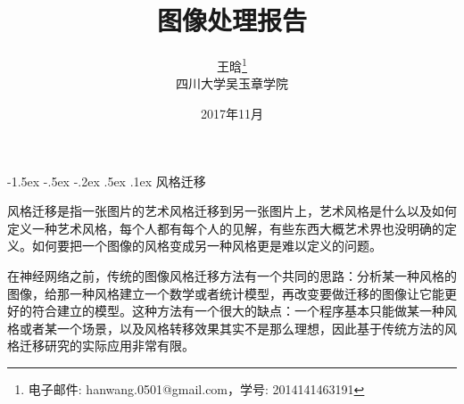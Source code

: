\documentclass[a4paper, 11pt]{article}
\makeatletter
\newcommand{\sihao}{\fontsize{14pt}{\baselineskip}\selectfont}
\newcommand{\xiaosihao}{\fontsize{12pt}{\baselineskip}\selectfont}
\renewcommand\section{\@startsection{section}{1}{\z@}%
{-1.5ex \@plus -.5ex \@minus -.2ex}%
{.5ex \@plus .1ex}%
{\normalfont\sihao\CJKfamily{hei}}}
\makeatother
\begin{document}
\newtheorem{example}{例}             %
\newtheorem{theorem}{定理}[section]  %
\newtheorem{definition}{定义}
\newtheorem{axiom}{公理}
\newtheorem{property}{性质}
\newtheorem{proposition}{命题}
\newtheorem{lemma}{引理}
\newtheorem{corollary}{推论}
\newtheorem{remark}{注解}
\newtheorem{condition}{条件}
\newtheorem{conclusion}{结论}
\newtheorem{assumption}{假设}

\renewcommand{\contentsname}{目录}  %
\renewcommand{\abstractname}{摘要}  %
\renewcommand{\refname}{参考文献}   %
\renewcommand{\indexname}{索引}
\renewcommand{\figurename}{图}
\renewcommand{\tablename}{表}
\renewcommand{\appendixname}{附录}
\newcommand{\upcite}[1]{\textsuperscript{\cite{#1}}}
\makeatletter
{}
\makeatother
\renewcommand{\theequation}{\arabic{section}.\arabic{equation}}
\renewcommand{\thefigure}{\arabic{section}.\arabic{figure}}

\renewcommand{\algorithmicrequire}{\textbf{Input:}} %
\renewcommand{\algorithmicensure}{\textbf{Output:}} %

\title{图像处理报告}
\author{王晗\footnote{电子邮件: hanwang.0501@gmail.com，学号: 2014141463191}\\[2ex]
\xiaosihao 四川大学吴玉章学院\\[2ex]
}
\date{2017年11月}


\maketitle

\tableofcontents
\newpage
\section{风格迁移}

风格迁移是指一张图片的艺术风格迁移到另一张图片上，艺术风格是什么以及如何定义一种艺术风格，每个人都有每个人的见解，有些东西大概艺术界也没明确的定义。如何要把一个图像的风格变成另一种风格更是难以定义的问题。

在神经网络之前，传统的图像风格迁移方法有一个共同的思路：分析某一种风格的图像，给那一种风格建立一个数学或者统计模型，再改变要做迁移的图像让它能更好的符合建立的模型。这种方法有一个很大的缺点：一个程序基本只能做某一种风格或者某一个场景，以及风格转移效果其实不是那么理想，因此基于传统方法的风格迁移研究的实际应用非常有限。
\end{document}
